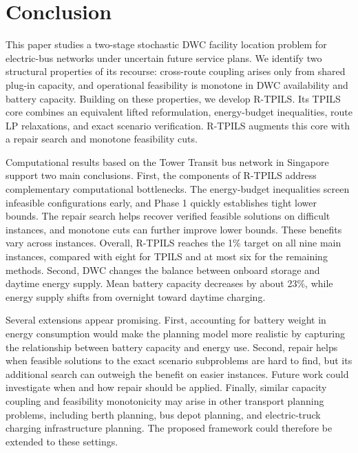 \FloatBarrier
\section{Conclusion}
\label{sec:conclusion}

This paper studies a two-stage stochastic DWC facility location problem for electric-bus networks under uncertain future service plans.
We identify two structural properties of its recourse: cross-route coupling arises only from shared plug-in capacity, and operational feasibility is monotone in DWC availability and battery capacity.
Building on these properties, we develop R-TPILS.
Its TPILS core combines an equivalent lifted reformulation, energy-budget inequalities, route LP relaxations, and exact scenario verification.
R-TPILS augments this core with a repair search and monotone feasibility cuts.

Computational results based on the Tower Transit bus network in Singapore support two main conclusions.
First, the components of R-TPILS address complementary computational bottlenecks.
The energy-budget inequalities screen infeasible configurations early, and Phase 1 quickly establishes tight lower bounds.
The repair search helps recover verified feasible solutions on difficult instances, and monotone cuts can further improve lower bounds.
These benefits vary across instances.
Overall, R-TPILS reaches the 1\% target on all nine main instances, compared with eight for TPILS and at most six for the remaining methods.
Second, DWC changes the balance between onboard storage and daytime energy supply.
Mean battery capacity decreases by about 23\%, while energy supply shifts from overnight toward daytime charging.

Several extensions appear promising.
First, accounting for battery weight in energy consumption would make the planning model more realistic by capturing the relationship between battery capacity and energy use.
Second, repair helps when feasible solutions to the exact scenario subproblems are hard to find, but its additional search can outweigh the benefit on easier instances.
Future work could investigate when and how repair should be applied.
Finally, similar capacity coupling and feasibility monotonicity may arise in other transport planning problems, including berth planning, bus depot planning, and electric-truck charging infrastructure planning.
The proposed framework could therefore be extended to these settings.
